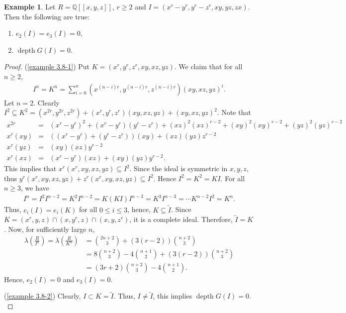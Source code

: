 \documentclass[reqno,a4paper,dvipsnames]{amsart}
\newcommand{\depth}{\operatorname{depth}}
\theoremstyle{definition}
\newtheorem{example}[theorem]{Example}
\begin{document}
\begin{example} 
\label{example 3.8}
Let $R=\mathbb{Q}[[x,y,z]]$, $r \ge 2$ and $I=(x^{r}-y^{r},y^{r}-z^{r},xy,yz,zx)$. 
Then the following are true:
\begin{enumerate}[\normalfont(i)]
    \item \label{example 3.8-1}
        $e_{2}(I)=e_{3}(I)=0,$
     \item \label{example 3.8-2}
  $\depth G(I)=0$.
   \end{enumerate}
\end{example}
\begin{proof}
(\ref{example 3.8-1})
Put $K = (x^r, y^r, z^r, xy, xz, yz)$. 
We claim that for all  $n \geq 2$, 
\begin{eqnarray*}
 I^n 
 = K^n
=  \sum_{i=0}^{n}(x^{(n-i)r}, y^{(n-i)r}, z^{(n-i)r}) (xy, xz, yz)^i.
\end{eqnarray*}
Let $n=2$. Clearly $I^2 \subseteq  K^2 = (x^{2r}, y^{2r}, z^{2r}) + (x^{r}, y^r, z^r)(xy, xz, yz)  + (xy, xz,yz)^2.$
Note that
\begin{eqnarray*}
     x^{2r} 
&=& (x^r-y^r)^2 + (x^r-y^r) (y^r-z^r) + (xz)^2 (xz)^{r-2} + (xy)^2 (xy)^{r-2} + (yz)^2(yz)^{r-2}\\
x^r(xy) 
&=& ((x^r-y^r) + (y^r-z^r)) (xy) + (xz)(yz) z^{r-2}\\
x^r (yz) 
&=& (xy)(xz)y^{r-2}\\
x^r (xz)
&=& (x^r-y^r) (xz) + (xy)(yz)y^{r-2}.
\end{eqnarray*}
This implies that $x^r(x^r, xy, xz, yz) \subseteq I^2$. Since the ideal is symmetric in $x,y,z$,  
thus $y^r(x^r, xy, xz, yz) + z^r(x^r, xy, xz, yz) \subseteq I^2$. Hence $I^2 = K^2 = KI$. 
For all $n \geq 3$,  we have
\begin{eqnarray*}
I^n 
= I^2 I^{n-2}
= K^2 I^{n-2}
= K (KI) I^{n-3}
= K^3 I^{n-3}
= \cdots   K^{n-2} I^2 = K^n. 
\end{eqnarray*} 
Thus, $e_{i}(I)=e_{i}(K)$ for all $0 \leq i \leq 3$,
hence, $K \subseteq \widetilde{I}$.  Since $K = (x^r, y,z) \cap (x, y^r, z) \cap (x,y,z^r)$, it is a complete ideal. Therefore, $\widetilde{I}=K$.  
Now, for sufficiently large $n$,   
\begin{align*}
\lambda \left(  \frac{R}{I^n}\right)  
=\lambda\left(  \frac{R}{K^n}\right) &= \binom{2n+2}{3} + (3(r-2))\binom{n+2}{3}\\
&=  8 \binom{n+2}{3} - 4 \binom{n+1}{2} + (3(r-2))\binom{n+2}{3}\\
&= (3r+2) \binom{n+2}{3} - 4 \binom{n+1}{2}.
\end{align*}
Hence, $e_{2}(I)=0$ and $e_{3}(I)=0.$

 (\ref{example 3.8-2}) Clearly, $I \subset K = \widetilde{I}.$ Thus, $I \neq \widetilde{I}$, this implies $\depth G(I)=0.$ 
\end{proof}
\end{document}
